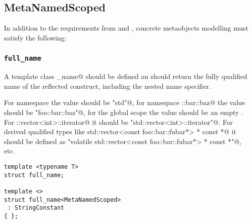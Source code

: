 \subsection{MetaNamedScoped}
\label{concept-MetaNamedScoped}


In addition to the requirements from  and ,
concrete metaobjects modelling  must satisfy the following:

\subsubsection{\texttt{full\_name}}

A template class \verb@full_name@ should be defined an should return the fully
qualified name of the reflected construct, including the nested name specifier.

For namespace \verb@std@ the value 
should be \verb@"std"@, for namespace \verb@foo::bar::baz@ the value should
be \verb@"foo::bar::baz"@, for the global scope the value should be an empty
.
For \verb@std::vector<int>::iterator@ it should be \verb@"std::vector<int>::iterator"@.
For derived qualified types like
\verb@volatile std::vector<const foo::bar::fubar*> * const *@ it should be defined as
\verb@"volatile std::vector<const foo::bar::fubar*> * const *"@, etc.

\begin{lstlisting}
template <typename T>
struct full_name;

template <>
struct full_name<MetaNamedScoped>
 : StringConstant
{ };
\end{lstlisting}


